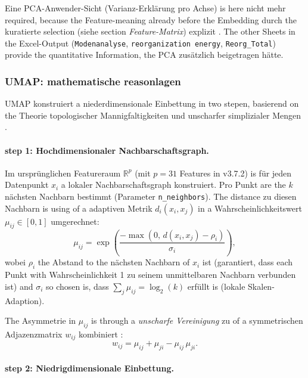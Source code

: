 \documentclass[11pt,a4paper,twoside]{article}
\theoremstyle{remark}
\begin{document}
Eine PCA-Anwender-Sicht (Varianz-Erkl\"arung pro Achse) is here nicht
mehr required, because the Feature-meaning already before the Embedding
durch the kuratierte selection (siehe section \emph{Feature-Matrix})
explizit . The other Sheets in the Excel-Output
(\texttt{Modenanalyse}, \texttt{reorganization energy},
\texttt{Reorg\_Total}) provide the quantitative Information, the PCA
zus\"atzlich beigetragen h\"atte.

\subsubsection*{UMAP: mathematische reasonlagen}

UMAP konstruiert a niederdimensionale Einbettung in two stepen,
basierend on the Theorie topologischer Mannigfaltigkeiten und
unscharfer simplizialer Mengen \cite{McInnes2018}.

\paragraph{step 1: Hochdimensionaler Nachbarschaftsgraph.}

Im urspr\"unglichen Featureraum $\mathbb{R}^p$ (mit $p = 31$ Features
in v3.7.2) is f\"ur jeden Datenpunkt $x_i$ a lokaler
Nachbarschaftsgraph konstruiert. Pro Punkt are the $k$ n\"achsten
Nachbarn bestimmt (Parameter \texttt{n\_neighbors}). The distance zu
diesen Nachbarn is using of a adaptiven Metrik
$d_i(x_i, x_j)$ in a Wahrscheinlichkeitswert $\mu_{ij} \in [0,1]$
umgerechnet:
\begin{equation}
  \mu_{ij} = \exp\!\left(\frac{-\max(0,\,
              d(x_i, x_j) - \rho_i)}{\sigma_i}\right),
  \label{eq:umap-mu}
\end{equation}
wobei $\rho_i$ the Abstand to the n\"achsten Nachbarn of $x_i$ ist
(garantiert, dass each Punkt with Wahrscheinlichkeit 1 zu seinem
unmittelbaren Nachbarn verbunden ist) and $\sigma_i$ so chosen is,
dass $\sum_j \mu_{ij} = \log_2(k)$ erf\"ullt is (lokale
Skalen-Adaption).

The Asymmetrie in $\mu_{ij}$ is through a \emph{unscharfe Vereinigung}
zu of a symmetrischen Adjazenzmatrix $w_{ij}$ kombiniert
\cite{McInnes2018}:
\begin{equation}
  w_{ij} = \mu_{ij} + \mu_{ji} - \mu_{ij}\,\mu_{ji}.
  \label{eq:umap-w}
\end{equation}

\paragraph{step 2: Niedrigdimensionale Einbettung.}
\end{document}
